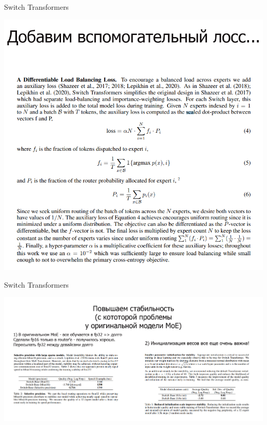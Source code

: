 \documentclass[aspectratio=169,xcolor=dvipsnames]{beamer}
\begin{document}
\begin{frame}{Switch Transformers}
\begin{center}
\includegraphics[scale=0.35]{st2.png}    
\end{center} 
\end{frame}

\begin{frame}{Switch Transformers}
\begin{center}
\vspace*{-0.5cm}
\includegraphics[scale=0.25]{st3.jpg}    
\end{center} 
\end{frame}
\end{document}
